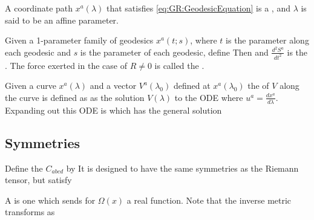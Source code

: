 \documentclass{article}
\begin{document}
\begin{definition}
A coordinate path $x^a(\lambda)$ that satisfies \eqref{eq:GR:GeodesicEquation} is a , and $\lambda$ is said to be an affine parameter. 
\end{definition}

\begin{theorem}
Given a 1-parameter family of geodesics $x^a(t;s)$, where $t$ is the parameter along each geodesic and $s$ is the parameter of each geodesic, define 
Then 
and 
$\frac{d^2 S^a}{dt^2}$ is the . The force exerted in the case of $R \neq 0$ is called the . 
\end{theorem}


\begin{definition}
Given a curve $x^a(\lambda)$ and a vector $V^a(\lambda_0)$ defined at $x^a(\lambda_0)$ the  of $V$ along the curve is defined as as the solution $V(\lambda)$ to the ODE
where $u^a = \frac{dx^a}{d\lambda}$. Expanding out this ODE is 
which has the general solution 
\end{definition}

\subsection{Symmetries}

\begin{definition}
Define the  $C_{abcd}$ by 
It is designed to have the same symmetries as the Riemann tensor, but satisfy 
\end{definition}

\begin{definition}
A  is one which sends 
for $\Omega(x)$ a real function. Note that the inverse metric transforms as 
\end{definition}
\end{document}
